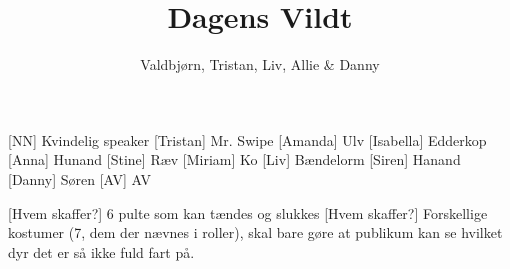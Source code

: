 \documentclass[a4paper,11pt]{article}
\title{Dagens Vildt}
\author{Valdbjørn, Tristan, Liv, Allie \& Danny}
\begin{document}
\maketitle

\begin{roles}
    [NN] Kvindelig speaker
    [Tristan] Mr. Swipe
    [Amanda] Ulv 
    [Isabella] Edderkop 
    [Anna] Hunand 
    [Stine] Ræv 
    [Miriam] Ko 
    [Liv] Bændelorm 
    [Siren] Hanand 
    [Danny] Søren 
    [AV] AV
\end{roles}

\begin{props}
  [Hvem skaffer?] 6 pulte som kan tændes og slukkes
  [Hvem skaffer?] Forskellige kostumer (7, dem der nævnes i roller), skal bare gøre at publikum kan se hvilket dyr det er så ikke fuld fart på.
\end{props}
\end{document}
